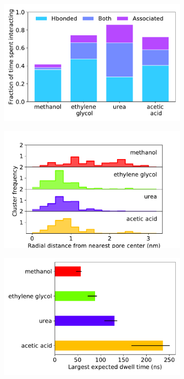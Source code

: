 \documentclass[journal=jpcbfk,manuscript=article]{achemso}
\begin{document}
  \begin{figure}
  \centering
  \begin{subfigure}{0.325\textwidth}
  \includegraphics[width=\textwidth]{hbonds_assoc_summary.pdf}
  \caption{}\label{fig:hbonds_assoc_summary}
  \end{subfigure}
  \begin{subfigure}{0.325\textwidth}
  \includegraphics[width=\textwidth]{rdf_summary.pdf}
  \caption{}\label{fig:rdf_summary}
  \end{subfigure}
  \begin{subfigure}{0.325\textwidth}
  \includegraphics[width=\textwidth]{dwell_time_summary.pdf}

\end{subfigure}
\end{figure}
\end{document}
